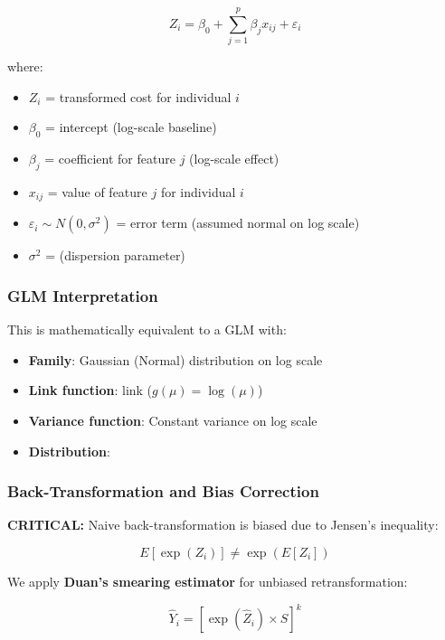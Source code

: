 \begin{equation}
Z_i = \beta_0 + \sum_{j=1}^{p} \beta_j x_{ij} + \varepsilon_i
\end{equation}

where:
\begin{itemize}
    \item $Z_i$ = transformed cost for individual $i$
    \item $\beta_0$ = intercept (log-scale baseline)
    \item $\beta_j$ = coefficient for feature $j$ (log-scale effect)
    \item $x_{ij}$ = value of feature $j$ for individual $i$
    \item $\varepsilon_i \sim N(0, \sigma^2)$ = error term (assumed normal on log scale)
    \item $\sigma^2$ = \ModelSixDispersion{} (dispersion parameter)
\end{itemize}

\subsubsection{GLM Interpretation}

This is mathematically equivalent to a GLM with:
\begin{itemize}
    \item \textbf{Family}: Gaussian (Normal) distribution on log scale
    \item \textbf{Link function}: \ModelSixLinkFunction{} link ($g(\mu) = \log(\mu)$)
    \item \textbf{Variance function}: Constant variance on log scale
    \item \textbf{Distribution}: \ModelSixDistribution{}
\end{itemize}

\subsubsection{Back-Transformation and Bias Correction}

\textbf{CRITICAL:} Naive back-transformation is biased due to Jensen's inequality:

\begin{equation}
E[\exp(Z_i)] \neq \exp(E[Z_i])
\end{equation}

We apply \textbf{Duan's smearing estimator} for unbiased retransformation:

\begin{equation}
\hat{Y}_i = \left[\exp(\hat{Z}_i) \times S\right]^k
\end{equation}

